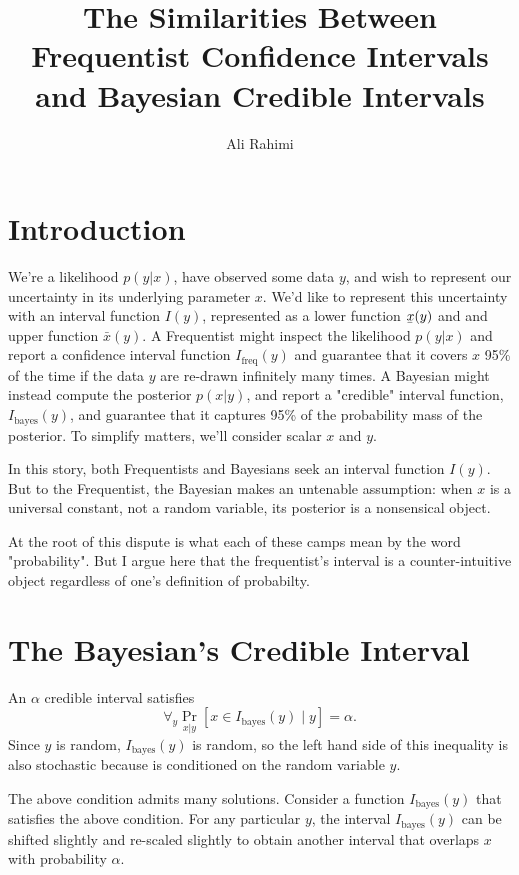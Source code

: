 \documentclass{article}
\title{The Similarities Between Frequentist Confidence Intervals and Bayesian Credible Intervals}
\author{Ali Rahimi}
\newcommand{\Ifreq}{I_\text{freq}}
\newcommand{\Ibayes}{I_\text{bayes}}
\newcommand{\xl}{\underaccent{\bar}{x}}
\newcommand{\xh}{\bar{x}}
\newcommand{\1}{\mathbf{1}}
\begin{document}
\maketitle

\section{Introduction}

We're a likelihood $p(y|x)$, have observed some data $y$, and wish to represent
our uncertainty in its underlying parameter $x$. We'd like to represent this
uncertainty with an interval function $I(y)$, represented as a lower function
$\xl(y)$ and and upper function $\xh(y)$. A Frequentist might inspect the
likelihood $p(y|x)$ and report a confidence interval function $\Ifreq(y)$ and
guarantee that it covers $x$ 95\% of the time if the data $y$ are re-drawn
infinitely many times.  A Bayesian might instead compute the posterior
$p(x|y)$, and report a "credible" interval function, $\Ibayes(y)$, and
guarantee that it captures 95\% of the probability mass of the posterior.
To simplify matters, we'll consider scalar $x$ and $y$.

In this story, both Frequentists and Bayesians seek an interval function
$I(y)$. But to the Frequentist, the Bayesian makes an untenable assumption:
when $x$ is a universal constant, not a random variable, its posterior is a
nonsensical object.

At the root of this dispute is what each of these camps mean by the word
"probability". But I argue here that the frequentist's interval is a
counter-intuitive object regardless of one's definition of probabilty.


\section{The Bayesian's Credible Interval}

An $\alpha$ credible interval satisfies
\[
\forall_y \Pr_{x|y}\left[ x \in \Ibayes(y) \;|\; y\right] = \alpha.
\]
Since $y$ is random, $\Ibayes(y)$ is random, so the left hand side of this
inequality is also stochastic because is conditioned on the random variable
$y$. 

The above condition admits many solutions. Consider a function
$\Ibayes(y)$ that satisfies the above condition. For any particular $y$, the
interval $\Ibayes(y)$ can be shifted slightly and re-scaled slightly to obtain
another interval that overlaps $x$ with probability $\alpha$.
\end{document}
